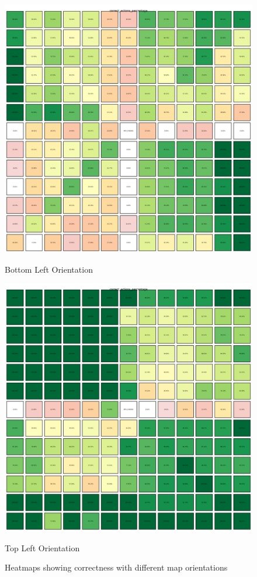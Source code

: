 \begin{figure}[h]
  \centering
  \begin{minipage}[b]{0.45\textwidth}
    \centering
    \includegraphics[width=\textwidth]{
      images/results_discussion/correctness_hm_BL.png
    }
    \caption{Bottom Left Orientation}
    \label{fig:heatmapBL}
  \end{minipage}
  \hfill
  \begin{minipage}[b]{0.45\textwidth}
    \centering
    \includegraphics[width=\textwidth]{
      images/results_discussion/correctness_hm_TL.png
    }
    \caption{Top Left Orientation}
    \label{fig:heatmapTL}
  \end{minipage}
  \caption{Heatmaps showing correctness with different map orientations}
  \label{fig:orientation_correctness}
\end{figure}
\vspace{5mm}

